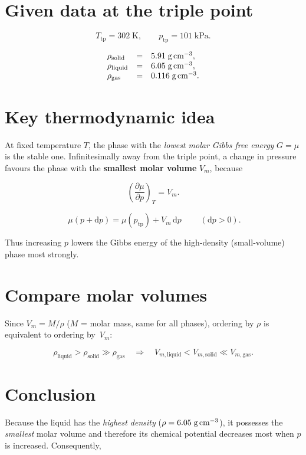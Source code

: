 \documentclass[12pt]{article}
\theoremstyle{definition} %
\theoremstyle{plain} %
\begin{document}
\section*{Given data at the triple point}

\[
T_{\text{tp}} = 302\;\text{K}, \qquad
p_{\text{tp}} = 101\;\text{kPa}.
\]

\[
\begin{array}{lcl}
\rho_{\text{solid}} &=& 5.91\;\text{g\,cm}^{-3}, \\
\rho_{\text{liquid}} &=& 6.05\;\text{g\,cm}^{-3}, \\
\rho_{\text{gas}}   &=& 0.116\;\text{g\,cm}^{-3}.
\end{array}
\]

\section*{Key thermodynamic idea}

At fixed temperature \(T\), the phase with the \emph{lowest molar
Gibbs free energy} \(G = \mu\) is the stable one.  Infinitesimally
away from the triple point, a change in pressure favours the phase
with the \textbf{smallest molar volume} \(V_{\!m}\), because

\[
\left(\frac{\partial \mu}{\partial p}\right)_T
   = V_{\!m}.
\]

\[
\boxed{\;
  \mu(p+\mathrm{d}p) = \mu(p_{\text{tp}}) + V_{\!m}\,\mathrm{d}p
\;}
\qquad(\mathrm{d}p>0).
\]

Thus increasing \(p\) lowers the Gibbs energy of the
high‑density (small‑volume) phase most strongly.

\section*{Compare molar volumes}

Since \(V_{\!m} = M/\rho\) (\(M\) = molar mass, same for all phases),
ordering by \(\rho\) is equivalent to ordering by~\(V_{\!m}\):

\[
\rho_{\text{liquid}} > \rho_{\text{solid}} \gg \rho_{\text{gas}}
\quad\Longrightarrow\quad
V_{m,\text{liquid}} < V_{m,\text{solid}} \ll V_{m,\text{gas}}.
\]

\section*{Conclusion}

Because the liquid has the \emph{highest density}
(\(\rho = 6.05\;\text{g\,cm}^{-3}\)), it possesses the \emph{smallest}
molar volume and therefore its chemical potential decreases most when
\(p\) is increased.  Consequently,
\end{document}

